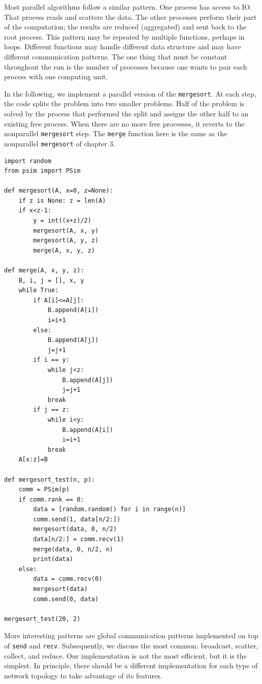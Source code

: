 \documentclass[justified, sixbynine]{tufte-book}
\def\ft{\small\tt}
\theoremstyle{plain}%
\newtheorem * {corollary}{Corollary}
\theoremstyle{definition}
\theoremstyle{remark}
\newtheorem * {remark}{Remark}
\newtheorem * {note}{Note}
\begin{document}
\begin{fullwidth}
Most parallel algorithms follow a similar pattern. One process has access to IO. That process reads and scatters the data. The other processes perform their part of the computation; the results are reduced (aggregated) and sent back to the root process. This pattern may be repeated by multiple functions, perhaps in loops. Different functions may handle different data structure and may have different communication patterns. The one thing that must be constant throughout the run is the number of processes because one wants to pair each process with one computing unit.

 In the following, we implement a parallel version of the {\ft mergesort}. At each step, the code splits the problem into two smaller problems. Half of the problem is solved by the process that performed the split and assigns the other half to an existing free process. When there are no more free processes, it reverts to the nonparallel {\ft mergesort} step. The {\ft merge} function here is the same as the nonparallel {\ft mergesort} of chapter 3.


\begin{lstlisting}[caption={in file: {\ft psim\_mergesort.py}}]
import random
from psim import PSim

def mergesort(A, x=0, z=None):
    if z is None: z = len(A)
    if x<z-1:
        y = int((x+z)/2)
        mergesort(A, x, y)
        mergesort(A, y, z)
        merge(A, x, y, z)

def merge(A, x, y, z):
    B, i, j = [], x, y
    while True:
        if A[i]<=A[j]:
            B.append(A[i])
            i=i+1
        else:
            B.append(A[j])
            j=j+1
        if i == y:
            while j<z:
                B.append(A[j])
                j=j+1
            break
        if j == z:
            while i<y:
                B.append(A[i])
                i=i+1
            break
    A[x:z]=B

def mergesort_test(n, p):
    comm = PSim(p)
    if comm.rank == 0:
        data = [random.random() for i in range(n)]
        comm.send(1, data[n/2:])
        mergesort(data, 0, n/2)
        data[n/2:] = comm.recv(1)
        merge(data, 0, n/2, n)
        print(data)
    else:
        data = comm.recv(0)
        mergesort(data)
        comm.send(0, data)

mergesort_test(20, 2)
\end{lstlisting}

More interesting patterns are global communication patterns implemented on top of {\ft send} and {\ft recv}. Subsequently, we discuss the most common: broadcast, scatter, collect, and reduce. Our implementation is not the most efficient, but it is the simplest. In principle, there should be a different implementation for each type of network topology to take advantage of its features.



\end{fullwidth}
\end{document}
